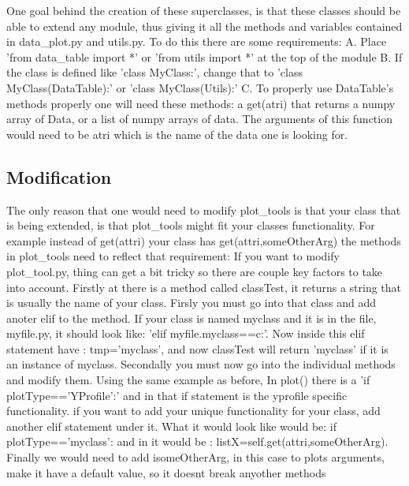 One goal behind the creation of these superclasses, is that these classes should be able to extend any module, thus giving it all the methods and variables contained in 
data\_plot.py and utils.py.  To do this there are some requirements:\newline
A. Place 'from data\_table import *' or 'from utils import *' at the top of the module\newline
B. If the class is defined like 'class MyClass:', change that to 
   'class MyClass(DataTable):' or 'class MyClass(Utils):'\newline
C. To properly use DataTable's methods properly one will need these methods:
	a get(atri) that returns a numpy array of Data, or a 
	list of numpy arrays of data.  The arguments of this function would need to be
	atri which is the name of the data one is looking for.\newline\newline

\subsection{Modification}
The only reason that one would need to modify plot\_tools is that your class that is being extended, is that plot_tools might fit your classes functionality.  For example
instead of get(attri) your class has get(attri,someOtherArg) the methods in plot\_tools need to reflect that requirement:
If you want to modify plot\_tool.py, thing can get a bit tricky so there are couple key factors to take into account.
Firstly at there is a method called classTest, it returns a string that is usually the name of your class.  Firsly you must go into that class
and add anoter elif to the method.  If your class is named myclass and it is in the file, myfile.py, it should look like: 
'elif myfile.myclass==c:'. Now inside this elif statement have : tmp='myclass', and now classTest will return 'myclass' if it is 
an instance of myclass.\newline
Secondally you must now go into the individual methods and modify them.  Using the same example as before,
In plot() there is a 'if plotType=='YProfile':' and in that if statement is the yprofile specific functionality. 
if you want to add your unique functionality for your class, add another elif statement under it.
What it would look like would be: if plotType=='myclass': and in it would be : listX=self.get(attri,someOtherArg).\newline
Finally we would need to add isomeOtherArg, in this case to plots arguments, make it have a default value, so it doesnt break anyother methods

